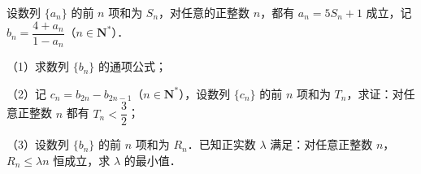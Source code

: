 \begin{question}
设数列 $\{a_n\}$ 的前 $n$ 项和为 $S_n$，对任意的正整数 $n$，都有 $a_n=5S_n+1$ 成立，记 $b_n=\dfrac{4+a_n}{1-a_n}$（$n\in\mathbf N^*$）．

（1）求数列 $\{b_n\}$ 的通项公式；

（2）记 $c_n=b_{2n}-b_{2n-1}$（$n\in\mathbf N^*$），设数列 $\{c_n\}$ 的前 $n$ 项和为 $T_n$，求证：对任意正整数 $n$ 都有 $T_n<\dfrac32$；

（3）设数列 $\{b_n\}$ 的前 $n$ 项和为 $R_n$．已知正实数 $\lambda$ 满足：对任意正整数 $n$，$R_n\leqslant\lambda n$ 恒成立，求 $\lambda$ 的最小值．

\end{question}